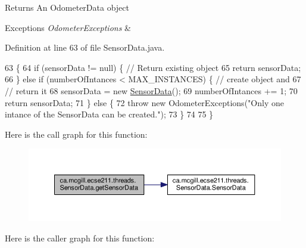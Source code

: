 \begin{DoxyReturn}{Returns}
An Odometer\+Data object 
\end{DoxyReturn}

\begin{DoxyExceptions}{Exceptions}
{\em Odometer\+Exceptions} & \\
\hline
\end{DoxyExceptions}


Definition at line 63 of file Sensor\+Data.\+java.


\begin{DoxyCode}
63                                                                                   \{
64     \textcolor{keywordflow}{if} (sensorData != null) \{ \textcolor{comment}{// Return existing object}
65       \textcolor{keywordflow}{return} sensorData;
66     \} \textcolor{keywordflow}{else} \textcolor{keywordflow}{if} (numberOfIntances < MAX\_INSTANCES) \{ \textcolor{comment}{// create object and}
67                                                    \textcolor{comment}{// return it}
68       sensorData = \textcolor{keyword}{new} \hyperlink{classca_1_1mcgill_1_1ecse211_1_1threads_1_1_sensor_data_a11dcdc9c15184e05a9c84fc3958e26b6}{SensorData}();
69       numberOfIntances += 1;
70       \textcolor{keywordflow}{return} sensorData;
71     \} \textcolor{keywordflow}{else} \{
72       \textcolor{keywordflow}{throw} \textcolor{keyword}{new} OdometerExceptions(\textcolor{stringliteral}{"Only one intance of the SensorData can be created."});
73     \}
74 
75   \}
\end{DoxyCode}
Here is the call graph for this function\+:\nopagebreak
\begin{figure}[H]
\begin{center}
\leavevmode
\includegraphics[width=350pt]{classca_1_1mcgill_1_1ecse211_1_1threads_1_1_sensor_data_a8260aba53b4474ca1275e4ce26157977_cgraph}
\end{center}
\end{figure}
Here is the caller graph for this function\+:\nopagebreak
